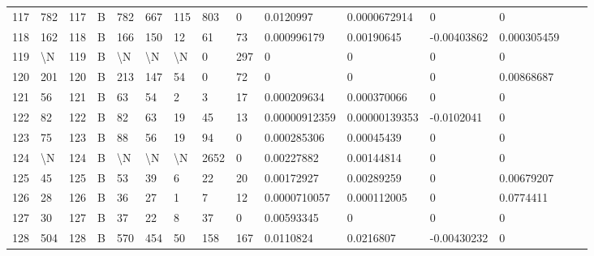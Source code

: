 \begin{longtable}{lllllllllllllll}
	117 & 782               & 117 & B   & 782               & 667               & 115               & 803  & 0          & 0.0120997      & 0.0000672914   & 0             & 0            \\
	118 & 162               & 118 & B   & 166               & 150               & 12                & 61   & 73         & 0.000996179    & 0.00190645     & -0.00403862   & 0.000305459  \\
	119 & \textbackslash{}N & 119 & B   & \textbackslash{}N & \textbackslash{}N & \textbackslash{}N & 0    & 297        & 0              & 0              & 0             & 0            \\
	120 & 201               & 120 & B   & 213               & 147               & 54                & 0    & 72         & 0              & 0              & 0             & 0.00868687   \\
	121 & 56                & 121 & B   & 63                & 54                & 2                 & 3    & 17         & 0.000209634    & 0.000370066    & 0             & 0            \\
	122 & 82                & 122 & B   & 82                & 63                & 19                & 45   & 13         & 0.00000912359  & 0.00000139353  & -0.0102041    & 0            \\
	123 & 75                & 123 & B   & 88                & 56                & 19                & 94   & 0          & 0.000285306    & 0.00045439     & 0             & 0            \\
	124 & \textbackslash{}N & 124 & B   & \textbackslash{}N & \textbackslash{}N & \textbackslash{}N & 2652 & 0          & 0.00227882     & 0.00144814     & 0             & 0            \\
	125 & 45                & 125 & B   & 53                & 39                & 6                 & 22   & 20         & 0.00172927     & 0.00289259     & 0             & 0.00679207   \\
	126 & 28                & 126 & B   & 36                & 27                & 1                 & 7    & 12         & 0.0000710057   & 0.000112005    & 0             & 0.0774411    \\
	127 & 30                & 127 & B   & 37                & 22                & 8                 & 37   & 0          & 0.00593345     & 0              & 0             & 0            \\
	128 & 504               & 128 & B   & 570               & 454               & 50                & 158  & 167        & 0.0110824      & 0.0216807      & -0.00430232   & 0            \\

\end{longtable}
